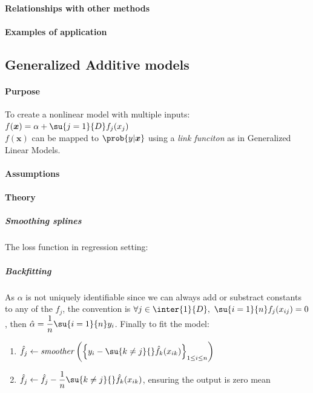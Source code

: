 \paragraph{Relationships with other methods}
\paragraph{Examples of application}

\subsection{Generalized Additive models}
\paragraph{Purpose}
To create a nonlinear model with multiple inputs: $f(\bm{x}) = \alpha + \su{j=1}{D}f_{
j}(x_{j})$\\
$f(\bm{x})$ can be mapped to $\prob{y|\bm{x}}$ using a \emph{link funciton} as in Generalized Linear
Models.
\paragraph{Assumptions}
\paragraph{Theory}
\subparagraph{Smoothing splines}
The loss function in regression setting:
\begin{center}
\end{center}
\subparagraph{Backfitting}
As $\alpha$ is not uniquely identifiable since we can always add or substract constants to any of 
the $f_{j}$, the convention is $\forall j\in\inter{1}{D},~\su{i=1}{n}f_{j}(x_{ij})=0$, then
$\hat{\alpha} = \dfrac{1}{n}\su{i=1}{n}y_{i}$.
Finally to fit the model:
\begin{enumerate}
    \item $\hat{f}_{j} \leftarrow \text{\emph{smoother}}\left(\left\{y_{i} - \su{k\neq j}{}\hat{f}_{
                k}(x_{ik})\right\}_{1\leq i\leq n}\right)$
        \item $\hat{f}_{j} \leftarrow \hat{f}_{j}- \dfrac{1}{n}\su{k\neq j}{}\hat{f}_{k}(x_{ik})$,
            ensuring the output is zero mean
\end{enumerate}



